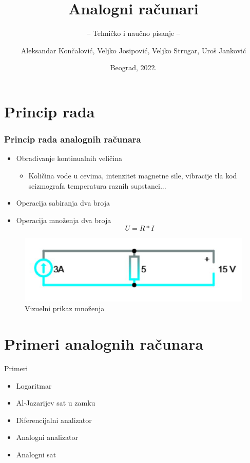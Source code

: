\documentclass[14pt]{beamer}
\title{Analogni računari}
\subtitle{-- Tehničko i naučno pisanje --}
\author{Aleksandar Končalović, Veljko Josipović, Veljko Strugar, Uroš Janković}
\institute{Matematički fakultet\\Univerzitet u Beogradu}
\date{
	\footnotesize{Beograd, 2022.}	
}
\begin{document}
\begin{frame}
	\thispagestyle{empty}
	\titlepage
\end{frame}

\addtocounter{framenumber}{-1}

\section{Princip rada}

\begin{frame}[fragile]\frametitle{Princip rada analognih računara}
	\begin{itemize}	
		\item Obrađivanje kontinualnih veličina
		  \begin{itemize}
                \item Količina vode u cevima, intenzitet magnetne sile, vibracije tla kod seizmografa temperatura raznih supstanci...
            \end{itemize}          
	

\item Operacija sabiranja dva broja

\item Operacija množenja dva broja \\ $$ U = R*I $$
\end{itemize}
\begin{figure}[h!]
\begin{center}
\includegraphics[scale=0.6]{Struja.jpg}
\end{center}
\caption{Vizuelni prikaz množenja}
\label{fig:h1}
\end{figure}
\end{frame}

\section{Primeri analognih računara}
\begin{frame}{Primeri}
	\begin{itemize}
		\item Logaritmar
		\item Al-Jazarijev sat u zamku
 		\item Diferencijalni analizator
		\item Analogni analizator
		\item Analogni sat
	\end{itemize}
\end{frame}
\end{document}
